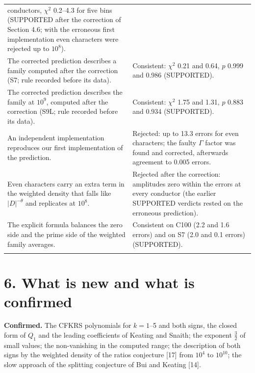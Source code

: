 \documentclass[
  10pt,
]{article}
\begin{document}
{\begin{longtable}[]{@{}
  >{\raggedright\arraybackslash}p{}
  >{\raggedright\arraybackslash}p{}@{}}
conductors, \(\chi^2\) 0.2--4.3 for five bins (SUPPORTED after the
correction of Section 4.6; with the erroneous first implementation even
characters were rejected up to \(10^8\)). \\ \addlinespace[2pt]
The corrected prediction describes a family computed after the
correction (S7; rule recorded before its data). & Consistent: \(\chi^2\)
0.21 and 0.64, \(p\) 0.999 and 0.986 (SUPPORTED). \\ \addlinespace[2pt]
The corrected prediction describes the family at \(10^9\), computed
after the correction (S9L; rule recorded before its data). & Consistent:
\(\chi^2\) 1.75 and 1.31, \(p\) 0.883 and 0.934 (SUPPORTED). \\ \addlinespace[2pt]
An independent implementation reproduces our first implementation of the
prediction. & Rejected: up to 13.3 errors for even characters; the
faulty \(\Gamma\) factor was found and corrected, afterwards agreement
to 0.005 errors. \\ \addlinespace[2pt]
Even characters carry an extra term in the weighted density that falls
like \(|D|^{-\theta}\) and replicates at \(10^8\). & Rejected after the
correction: amplitudes zero within the errors at every conductor (the
earlier SUPPORTED verdicts rested on the erroneous prediction). \\ \addlinespace[2pt]
The explicit formula balances the zero side and the prime side of the
weighted family averages. & Consistent on C100 (2.2 and 1.6 errors) and
on S7 (2.0 and 0.1 errors) (SUPPORTED). \\ \addlinespace[2pt]
\end{longtable}}

\hypertarget{what-is-new-and-what-is-confirmed}{%
\section{6. What is new and what is
confirmed}\label{what-is-new-and-what-is-confirmed}}

\textbf{Confirmed.} The CFKRS polynomials for \(k = 1\)--5 and both
signs, the closed form of \(Q_1\) and the leading coefficients of
Keating and Snaith; the exponent \(\tfrac32\) of small values; the
non-vanishing in the computed range; the description of both signs by
the weighted density of the ratios conjecture {[}17{]} from \(10^4\) to
\(10^{10}\); the slow approach of the splitting conjecture of Bui and
Keating {[}14{]}.
\end{document}

